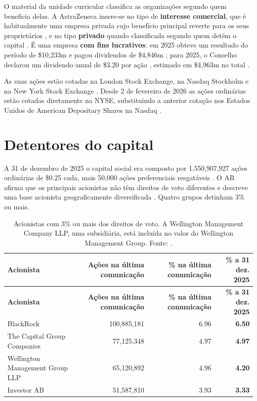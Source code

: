 O material da unidade curricular classifica as organizações segundo quem beneficia delas. A AstraZeneca insere-se no tipo de \textbf{interesse comercial}, que é habitualmente uma empresa privada cujo benefício principal reverte para os seus proprietários \cite[pp.~4--5]{INT}, e no tipo \textbf{privado} quando classificada segundo quem detém o capital \cite[p.~6]{INT}. É uma empresa \textbf{com fins lucrativos}: em 2025 obteve um resultado do período de \$10,233m e pagou dividendos de \$4,846m \cite[p.~125]{AR}; para 2025, o Conselho declarou um dividendo anual de \$3.20 por ação \cite[p.~3]{AR}, estimado em \$4,963m no total \cite[p.~225]{AR}.

As suas ações estão cotadas na London Stock Exchange, na Nasdaq Stockholm e na New York Stock Exchange \cite[p.~71]{AR}. Desde 2 de fevereiro de 2026 as ações ordinárias estão cotadas diretamente na NYSE, substituindo a anterior cotação nos Estados Unidos de American Depositary Shares na Nasdaq \cite[p.~50]{AR}.

\section{Detentores do capital}

A 31 de dezembro de 2025 o capital social era composto por 1,550,907,927 ações ordinárias de \$0.25 cada, mais 50,000 ações preferenciais resgatáveis \cite[p.~224]{AR}. O AR afirma que os principais acionistas não têm direitos de voto diferentes \cite[p.~225]{AR} e descreve uma base acionista geograficamente diversificada \cite[p.~76]{AR}. Quatro grupos detinham 3\% ou mais.

\begin{xltabular}{\linewidth}{@{}Yrrr@{}}
\caption{Acionistas com 3\% ou mais dos direitos de voto. A Wellington Management Company LLP, uma subsidiária, está incluída no valor do Wellington Management Group. Fonte: \cite[p.~225]{AR}.}\label{tab:acionistas}\\*
\toprule
\textbf{Acionista} & \textbf{Ações na última comunicação} & \textbf{\% na última comunicação} & \textbf{\% a 31 dez. 2025} \\*
\midrule
\endfirsthead
\toprule
\textbf{Acionista} & \textbf{Ações na última comunicação} & \textbf{\% na última comunicação} & \textbf{\% a 31 dez. 2025} \\*
\midrule
\endhead
\bottomrule
\endfoot
BlackRock & 100,885,181 & 6.96 & \textbf{6.50} \\
The Capital Group Companies & 77,125,348 & 4.97 & \textbf{4.97} \\
Wellington Management Group LLP & 65,120,892 & 4.96 & \textbf{4.20} \\
Investor AB & 51,587,810 & 3.93 & \textbf{3.33} \\
\end{xltabular}

